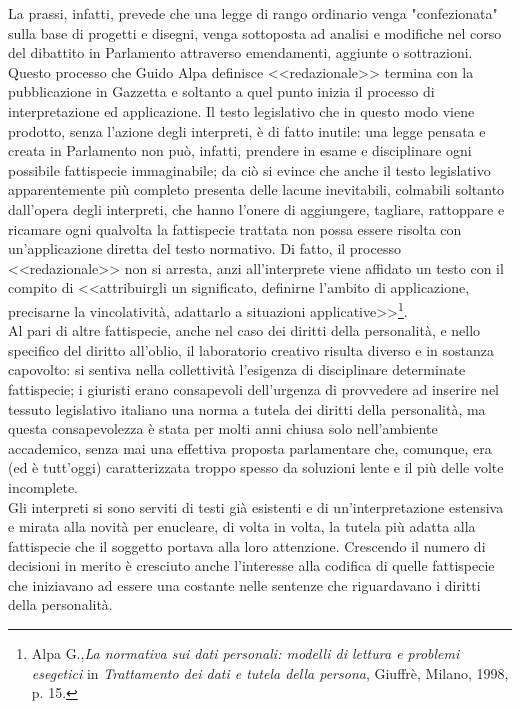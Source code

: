 La prassi, infatti, prevede che una legge di rango ordinario venga "confezionata" sulla base di progetti e disegni, venga sottoposta ad analisi e modifiche  nel corso del dibattito in Parlamento attraverso emendamenti, aggiunte o sottrazioni. Questo processo che Guido Alpa definisce <<redazionale>> termina con la pubblicazione in Gazzetta e soltanto a quel punto inizia il processo di interpretazione ed applicazione.
Il testo legislativo che in questo modo viene prodotto, senza l'azione degli interpreti, è di fatto inutile: una legge pensata e creata in Parlamento non può, infatti, prendere in esame e disciplinare ogni possibile fattispecie immaginabile; da ciò si evince che anche il testo legislativo apparentemente più completo presenta delle lacune inevitabili, colmabili soltanto dall'opera degli interpreti, che hanno l'onere di aggiungere, tagliare, rattoppare e ricamare ogni qualvolta la fattispecie trattata non possa essere risolta con un'applicazione diretta del testo normativo.
Di fatto, il processo <<redazionale>> non si arresta, anzi all'interprete viene affidato un testo con il compito di <<attribuirgli un significato, definirne l'ambito di applicazione, precisarne la vincolatività, adattarlo a situazioni applicative>>\footnote{Alpa G.,\textit{La normativa sui dati personali: modelli di lettura e problemi esegetici} in \textit{Trattamento dei dati e tutela della persona}, Giuffrè, Milano, 1998, p. 15.}.
\\Al pari di altre fattispecie, anche nel caso dei diritti della personalità, e nello specifico del diritto all'oblio, il laboratorio creativo risulta diverso e in sostanza capovolto: si sentiva nella collettività l'esigenza di disciplinare determinate fattispecie; i giuristi erano consapevoli dell'urgenza di provvedere ad inserire nel tessuto legislativo italiano una norma a tutela dei diritti della personalità, ma questa consapevolezza è stata per molti anni chiusa solo nell'ambiente accademico, senza mai una effettiva proposta parlamentare che, comunque, era (ed è tutt'oggi) caratterizzata troppo spesso da soluzioni lente e il più delle volte incomplete.
\\Gli interpreti si sono serviti di testi già esistenti e di un'interpretazione estensiva e mirata alla novità per enucleare, di volta in volta, la tutela più adatta alla fattispecie che il soggetto portava alla loro attenzione.
Crescendo il numero di decisioni in merito è cresciuto anche l'interesse alla codifica di quelle fattispecie che iniziavano ad essere una costante nelle sentenze che riguardavano i diritti della personalità.
